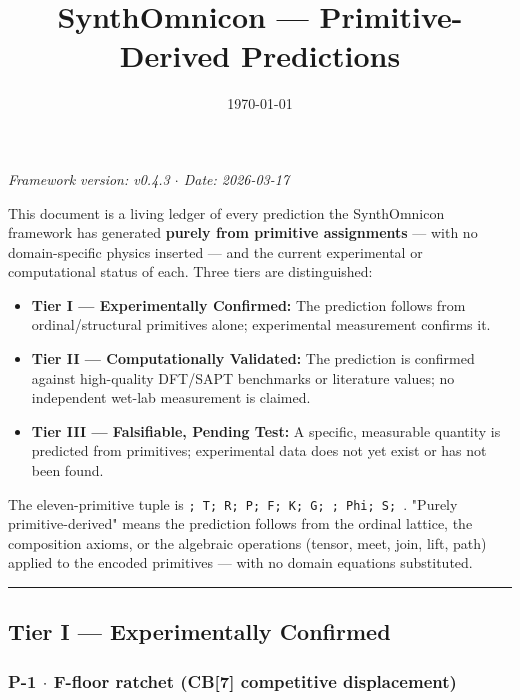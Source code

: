 \documentclass[12pt,a4paper]{article}
\begin{document}
\title{SynthOmnicon --- Primitive-Derived Predictions}
\date{\today}

\maketitle

\emph{Framework version: v0.4.3 $\cdot$ Date: 2026-03-17}

This document is a living ledger of every prediction the SynthOmnicon framework has generated \textbf{purely from primitive assignments} --- with no domain-specific physics inserted --- and the current experimental or computational status of each. Three tiers are distinguished:

\begin{itemize}
    \item \textbf{Tier I --- Experimentally Confirmed:} The prediction follows from ordinal/structural primitives alone; experimental measurement confirms it.
    \item \textbf{Tier II --- Computationally Validated:} The prediction is confirmed against high-quality DFT/SAPT benchmarks or literature values; no independent wet-lab measurement is claimed.
    \item \textbf{Tier III --- Falsifiable, Pending Test:} A specific, measurable quantity is predicted from primitives; experimental data does not yet exist or has not been found.
\end{itemize}

The eleven-primitive tuple is \texttt{\langleD; T; R; P; F; K; G; \Gamma; Phi; S; \Omega\rangle}. "Purely primitive-derived" means the prediction follows from the ordinal lattice, the composition axioms, or the algebraic operations (tensor, meet, join, lift, path) applied to the encoded primitives --- with no domain equations substituted.

\begin{center}
\rule{0.5\textwidth}{0.4pt}
\end{center}

\subsection{Tier I --- Experimentally Confirmed}

\subsubsection{P-1 $\cdot$ F-floor ratchet (CB{[}7{]} competitive displacement)}
\end{document}
